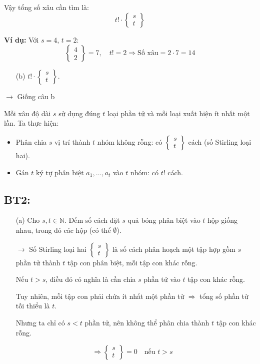 \documentclass{article}
\begin{document}
	Vậy tổng số xâu cần tìm là:
	\[
	\boxed{
		t! \cdot \left\{ \begin{matrix} s \\ t \end{matrix} \right\}
	}
	\]
	
	\textbf{Ví dụ:} Với $s = 4$, $t = 2$:
	\[
	\left\{ \begin{matrix} 4 \\ 2 \end{matrix} \right\} = 7, \quad t! = 2 \Rightarrow \text{Số xâu} = 2 \cdot 7 = 14
	\]
	
	\begin{enumerate}
		\item[(b)] $	t! \cdot \left\{ \begin{matrix} s \\ t \end{matrix} \right\}$.
	\end{enumerate}
	$\rightarrow$ Giống câu b
	
	Mỗi xâu độ dài $s$ sử dụng đúng $t$ loại phần tử và mỗi loại xuất hiện ít nhất một lần. Ta thực hiện:
	
	\begin{itemize}
		\item Phân chia $s$ vị trí thành $t$ nhóm không rỗng: có $\left\{ \begin{matrix} s \\ t \end{matrix} \right\}$ cách (số Stirling loại hai).
		\item Gán $t$ ký tự phân biệt $a_1, \dots, a_t$ vào $t$ nhóm: có $t!$ cách.
	\end{itemize}
	
	\subsection*{BT2:}
	\begin{enumerate}
		\item[(a)] 
		Cho $s, t \in \mathbb{N}$. Đếm số cách đặt $s$ quả bóng phân biệt vào $t$ hộp giống nhau, trong đó các hộp (có thể $\emptyset$).
		
		
		$\rightarrow$
		Số Stirling loại hai $\left\{ \begin{matrix}
			s \\
			t
		\end{matrix} \right\}$ là số cách phân hoạch một tập hợp gồm $s$ phần tử thành $t$ tập con phân biệt, mỗi tập con khác rỗng.
		
		Nếu $t > s$, điều đó có nghĩa là cần chia $s$ phần tử vào $t$ tập con khác rỗng.
		
		Tuy nhiên, mỗi tập con phải chứa ít nhất một phần tử $\Rightarrow$ tổng số phần tử tối thiểu là $t$. 
		
		Nhưng ta chỉ có $s < t$ phần tử, nên không thể phân chia thành $t$ tập con khác rỗng.
		
		\[
		\Rightarrow \left\{ \begin{matrix}
			s \\
			t
		\end{matrix} \right\} = 0 \quad \text{nếu } t > s \quad
		\]
	\end{enumerate}
	
\end{document}
